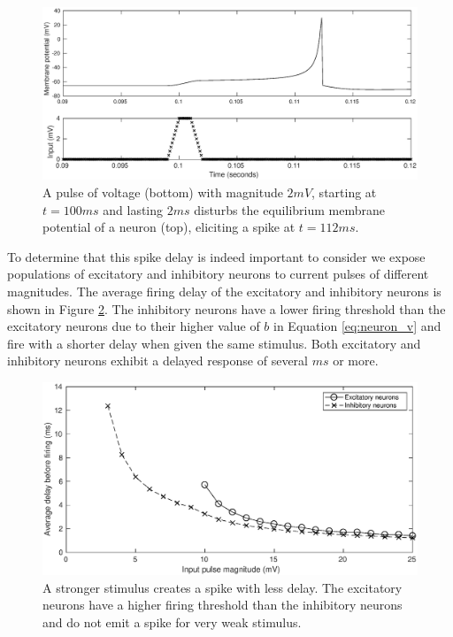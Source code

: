 \documentclass[12pt]{article}
\begin{document}
\begin{figure}[!htb]
 \caption{ A pulse of voltage (bottom) with magnitude $2 mV$, starting at $t=100 ms$ and lasting $2 ms$ disturbs the equilibrium membrane potential of a neuron (top), eliciting a spike at $t=112 ms$. }
 \label{fig:delay_neuronstep}
 \centering
   \includegraphics[width=\textwidth]{fig/WaveSpeed_NeuronStepTest}
\end{figure}

To determine  that this spike delay is indeed important to consider  we expose populations of excitatory and inhibitory neurons to current pulses of different magnitudes.
The average firing delay of the excitatory and inhibitory neurons is shown in Figure \ref{fig:delay_neurondynamics}.
The inhibitory neurons have a lower firing threshold than the excitatory neurons due to their higher value of $b$ in Equation \ref{eq:neuron_v}  \parencite{izhikevich2003} and fire with a shorter delay when given the same stimulus.
Both excitatory and inhibitory neurons exhibit a delayed response of several $ms$ or more.
\begin{figure}[!htb]
 \caption{ A stronger stimulus creates a spike with less delay. The excitatory neurons have a higher firing threshold than the inhibitory neurons and do not emit a spike for very weak stimulus.}
 \label{fig:delay_neurondynamics}
 \centering
   \includegraphics[width=\textwidth]{fig/WaveSpeed_NeuronDynamics}
\end{figure}
\end{document}
